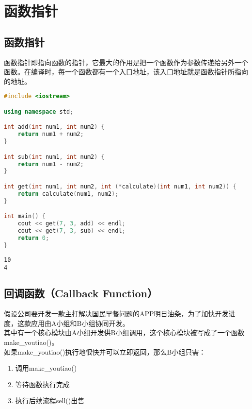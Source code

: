 \newpage

\section{函数指针}

\subsection{函数指针}

函数指针即指向函数的指针，它最大的作用是把一个函数作为参数传递给另外一个函数。在编译时，每一个函数都有一个入口地址，该入口地址就是函数指针所指向的地址。 \\


\begin{lstlisting}[language=C++]
#include <iostream>

using namespace std;

int add(int num1, int num2) {
    return num1 + num2;
}

int sub(int num1, int num2) {
    return num1 - num2;
}

int get(int num1, int num2, int (*calculate)(int num1, int num2)) {
    return calculate(num1, num2);
}

int main() {
    cout << get(7, 3, add) << endl;
    cout << get(7, 3, sub) << endl;
    return 0;
}
\end{lstlisting}

\begin{tcolorbox}
	\begin{verbatim}
10
4
	\end{verbatim}
\end{tcolorbox}

\subsection{回调函数（Callback Function）}

假设公司要开发一款主打解决国民早餐问题的APP明日油条，为了加快开发进度，这款应用由A小组和B小组协同开发。 \\

其中有一个核心模块由A小组开发供B小组调用，这个核心模块被写成了一个函数make\_youtiao()。 \\

如果make\_youtiao()执行地很快并可以立即返回，那么B小组只需：

\begin{enumerate}
	\item 调用make\_youtiao()
	\item 等待函数执行完成
	\item 执行后续流程sell()出售
\end{enumerate}

